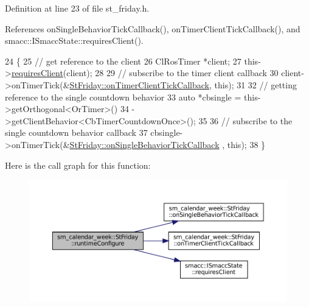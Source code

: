 Definition at line 23 of file st\+\_\+friday.\+h.



References on\+Single\+Behavior\+Tick\+Callback(), on\+Timer\+Client\+Tick\+Callback(), and smacc\+::\+I\+Smacc\+State\+::requires\+Client().


\begin{DoxyCode}
24     \{
25         \textcolor{comment}{// get reference to the client}
26         ClRosTimer *client;
27         this->\hyperlink{classsmacc_1_1ISmaccState_a7f95c9f0a6ea2d6f18d1aec0519de4ac}{requiresClient}(client);
28 
29         \textcolor{comment}{// subscribe to the timer client callback}
30         client->onTimerTick(&\hyperlink{structsm__calendar__week_1_1StFriday_a79317a2a67708590e046d49627a30a55}{StFriday::onTimerClientTickCallback}, \textcolor{keyword}{this});
31 
32         \textcolor{comment}{// getting reference to the single countdown behavior}
33         \textcolor{keyword}{auto} *cbsingle = this->getOrthogonal<OrTimer>()
34                              ->getClientBehavior<CbTimerCountdownOnce>();
35 
36         \textcolor{comment}{// subscribe to the single countdown behavior callback}
37         cbsingle->onTimerTick(&\hyperlink{structsm__calendar__week_1_1StFriday_a3d697235b90c176eb1524cd76c2d628f}{StFriday::onSingleBehaviorTickCallback}
      , \textcolor{keyword}{this});
38     \}
\end{DoxyCode}
Here is the call graph for this function\+:
\nopagebreak
\begin{figure}[H]
\begin{center}
\leavevmode
\includegraphics[width=350pt]{structsm__calendar__week_1_1StFriday_a5fce56702b4d55872f82dc77194e9067_cgraph}
\end{center}
\end{figure}
\mbox{\label{structsm__calendar__week_1_1StFriday_a887ff28737ceb01b3540a1295bd75bb0}} 
